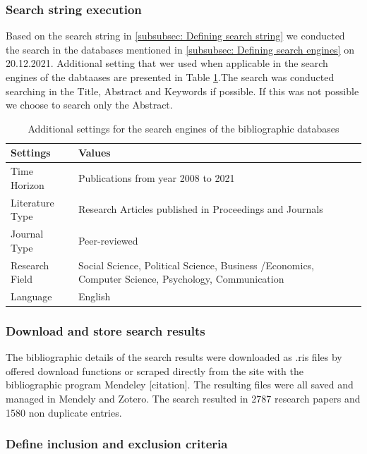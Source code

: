 \subsubsection{Search string execution}

Based on the search string in \ref{subsubsec: Defining search string} we conducted the search in the databases mentioned in \ref{subsubsec: Defining search engines} on 20.12.2021. Additional setting that wer used when applicable in the search engines of the dabtaases are presented in Table \ref{tab: search settings}.The search was conducted searching in the Title, Abstract and Keywords if possible. If this was not possible we choose to search only the Abstract.

\begin{table}
	\caption{Additional settings for the search engines of the bibliographic databases}
	\centering
	\begin{tabular}{ll}
		\toprule
		Settings     & Values \\
		\midrule
		Time Horizon & Publications from year 2008 to 2021 \\ 
		Literature Type & Research Articles published in Proceedings and  Journals \\
		Journal Type & Peer-reviewed \\
		Research Field & Social Science, Political Science, Business /Economics, Computer Science, Psychology, Communication \\
		Language & English \\
		\bottomrule 
	\end{tabular}
	\label{tab: search settings}
\end{table} 

\subsubsection{Download and store search results}

The bibliographic details of the search results were downloaded as .ris files by offered download functions or scraped directly from the site with the bibliographic program Mendeley [citation]. The resulting files were all saved and managed in Mendely and Zotero. The search resulted in 2787 research papers and 1580 non duplicate entries.

\subsubsection{Define inclusion and exclusion criteria}

